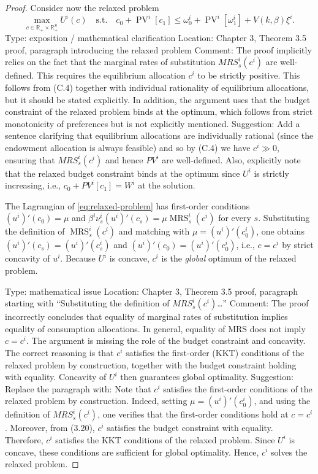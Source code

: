 \documentclass[11pt,a4paper,oneside]{book}
\def\R{\mathbb{R}}
\def\leq{\leqslant}
\DeclareMathOperator{\MRS}{MRS}
\DeclareMathOperator{\PV}{PV}
\theoremstyle{plain}
\theoremstyle{definition}
\theoremstyle{remark}
\numberwithin{equation}{chapter}
\begin{document}
\begin{proof}
Consider now the relaxed problem
\begin{equation}\label{eq:relaxed-problem}
  \max_{c \in \R_+ \times \R_+^S} U^i(c)
  \quad \text{s.t.} \quad
  c_0 + \PV^i[c_1] \leq \omega^i_0 + \PV^i[\omega^i_1] + V(k, \beta) \xi^i.
\end{equation}
Type: exposition / mathematical clarification  
Location: Chapter 3, Theorem 3.5 proof, paragraph introducing the relaxed problem  
Comment:  
The proof implicitly relies on the fact that the marginal rates of substitution $MRS^i_s(c^i)$ are well-defined. This requires the equilibrium allocation $c^i$ to be strictly positive. This follows from (C.4) together with individual rationality of equilibrium allocations, but it should be stated explicitly. In addition, the argument uses that the budget constraint of the relaxed problem binds at the optimum, which follows from strict monotonicity of preferences but is not explicitly mentioned.  
Suggestion:  
Add a sentence clarifying that equilibrium allocations are individually rational (since the endowment allocation is always feasible) and so by (C.4) we have $c^i \gg 0$, ensuring that $MRS^i_s(c^i)$ and hence $PV^i$ are well-defined. Also, explicitly note that the relaxed budget constraint binds at the optimum since $U^i$ is strictly increasing, i.e., $c_0 + PV^i[c_1] = W^i$ at the solution.

The Lagrangian of \eqref{eq:relaxed-problem} has first-order conditions $(u^i)'(c_0) = \mu$ and $\beta^i \nu^i_s (u^i)'(c_s) = \mu \MRS^i_s(c^i)$ for every $s$.
Substituting the definition of $\MRS^i_s(c^i)$ and matching with $\mu = (u^i)'(c^i_0)$, one obtains $(u^i)'(c_s) = (u^i)'(c^i_s)$ and $(u^i)'(c_0) = (u^i)'(c^i_0)$, i.e., $c = c^i$ by strict concavity of $u^i$.
Because $U^i$ is concave, $c^i$ is the \emph{global} optimum of the relaxed problem.

Type: mathematical issue  
Location: Chapter 3, Theorem 3.5 proof, paragraph starting with “Substituting the definition of $MRS^i_s(c^i)$…”  
Comment:  
The proof incorrectly concludes that equality of marginal rates of substitution implies equality of consumption allocations. In general, equality of MRS does not imply $c = c^i$. The argument is missing the role of the budget constraint and concavity. The correct reasoning is that $c^i$ satisfies the first-order (KKT) conditions of the relaxed problem by construction, together with the budget constraint holding with equality. Concavity of $U^i$ then guarantees global optimality.  
Suggestion:  
Replace the paragraph with:
\medskip
\noindent
Note that $c^i$ satisfies the first-order conditions of the relaxed problem by construction. Indeed, setting $\mu = (u^i)'(c^i_0)$, and using the definition of $MRS^i_s(c^i)$, one verifies that the first-order conditions hold at $c = c^i$. Moreover, from (3.20), $c^i$ satisfies the budget constraint with equality. Therefore, $c^i$ satisfies the KKT conditions of the relaxed problem. Since $U^i$ is concave, these conditions are sufficient for global optimality. Hence, $c^i$ solves the relaxed problem.


\end{proof}
\end{document}
